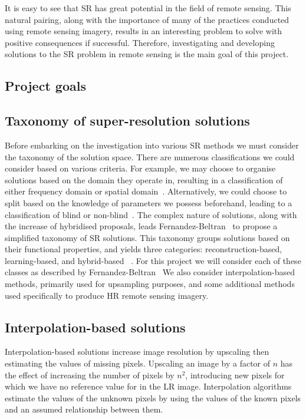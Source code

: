 It is easy to see that SR has great potential in the field of remote sensing. This natural pairing, along with the importance of many of the practices conducted using remote sensing imagery, results in an interesting problem to solve with positive consequences if successful. Therefore, investigating and developing solutions to the SR problem in remote sensing is the main goal of this project.

\subsection{Project goals}

\subsection{Taxonomy of super-resolution solutions}
Before embarking on the investigation into various SR methods we must consider the taxonomy of the solution space. There are numerous classifications we could consider based on various criteria. For example, we may choose to organise solutions based on the domain they operate in, resulting in a classification of either frequency domain or spatial domain~\cite{superResRemoteSensingOverview}. Alternatively, we could choose to split based on the knowledge of parameters we possess beforehand, leading to a classification of blind or non-blind~\cite{superResRemoteSensingOverview}. The complex nature of solutions, along with the increase of hybridised proposals, leads Fernandez-Beltran \etal\ to propose a simplified taxonomy of SR solutions. This taxonomy groups solutions based on their functional properties, and yields three categories: reconstruction-based, learning-based, and hybrid-based ~\cite{superResRemoteSensingOverview}. For this project we will consider each of these classes as described by Fernandez-Beltran \etal\ We also consider interpolation-based methods, primarily used for upsampling purposes, and some additional methods used specifically to produce HR remote sensing imagery.

\subsection{Interpolation-based solutions}
Interpolation-based solutions increase image resolution by upscaling then estimating the values of missing pixels. Upscaling an image by a factor of $n$ has the effect of increasing the number of pixels by $n^2$, introducing new pixels for which we have no reference value for in the LR image. Interpolation algorithms estimate the values of the unknown pixels by using the values of the known pixels and an assumed relationship between them. 

